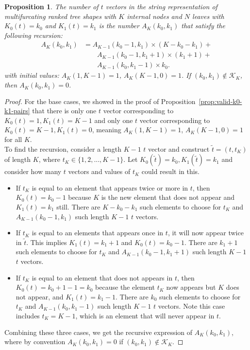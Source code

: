 \documentclass{article}
\newtheorem{proposition}[theorem]{Proposition}
\begin{document}
\begin{proposition} \label{prop:string-counting-recursion}
The number of $t$ vectors in the string representation of multifurcating ranked tree shapes with $K$ internal nodes and $N$ leaves with $K_{0}(t)=k_{0}$ and $K_{1}(t)=k_{1}$ is the number $A_K(k_{0},k_{1})$ that satisfy the following recursion:
\begin{align} \label{eq:K0_K1_recursionb}
    A_K(k_{0}, k_{1}) &= A_{K-1}(k_{0}-1, k_{1}) \times (K-k_{0}-k_{1}) + \\
    &\qquad A_{K-1}(k_{0}-1, k_{1}+1)\times (k_{1}+1) + \nonumber \\
    &\qquad A_{K-1}(k_{0}, k_{1}-1)\times k_{0}.  \nonumber
    \nonumber
\end{align}
with initial values: $A_K(1,K-1)=1$, $A_K(K-1,0)=1$. If $(k_0, k_1) \notin \mathcal{K}_K$, then $A_K(k_0, k_1)=0$.
\end{proposition}
\begin{proof}
For the base cases, we showed in the proof of Proposition~\ref{prop:valid-k0-k1-pairs} that there is only one $t$ vector corresponding to $K_0(t)=1, K_1(t)=K-1$ and only one $t$ vector corresponding to $K_0(t)=K-1, K_1(t)=0$, meaning $A_K(1,K-1)=1$, $A_K(K-1,0)=1$ for all $K$. \\

\noindent To find the recursion, consider a length $K-1$ $t$ vector and construct $\tilde{t} = (t, t_K)$ of length $K$, where $t_K \in \{1,2,...,K-1\}$. Let $K_0(\tilde{t}) = k_0, K_1(\tilde{t})= k_1$ and consider how many $t$ vectors and values of $t_K$ could result in this. 
\begin{itemize}
    \item If $t_K$ is equal to an element that appears twice or more in $t$, then $K_0(t)= k_0-1$ because $K$ is the new element that does not appear and $K_1(t) = k_1$ still. There are $K-k_0-k_1$ such elements to choose for $t_K$ and $A_{K-1}(k_0-1, k_1)$ such length $K-1$ $t$ vectors. 
    \item If $t_K$ is equal to an elements that appears once in $t$, it will now appear twice in $\tilde{t}$. This implies $K_1(t) = k_1 +1$ and $K_0(t)= k_0-1$. There are $k_1+1$ such elements to choose for $t_K$ and $A_{K-1}(k_0-1, k_1+1)$ such length $K-1$ $t$ vectors. 
    \item If $t_K$ is equal to an element that does not appears in $t$, then $K_0(t) = k_0 +1-1=k_0$ because the element $t_K$ now appears but $K$ does not appear, and $K_1(t) = k_1-1$. There are $k_{0}$ such elements to choose for $t_K$ and $A_{K-1}(k_0, k_1-1)$ such length $K-1$ $t$ vectors. Note this case includes $t_K=K-1$, which is an element that will never appear in $t$. 
\end{itemize}
Combining these three cases, we get the recursive expression of $A_K(k_{0}, k_{1})$, where by convention $A_K(k_0, k_1)=0$ if $(k_0, k_1) \notin \mathcal{K}_K$.
\end{proof}
\end{document}
